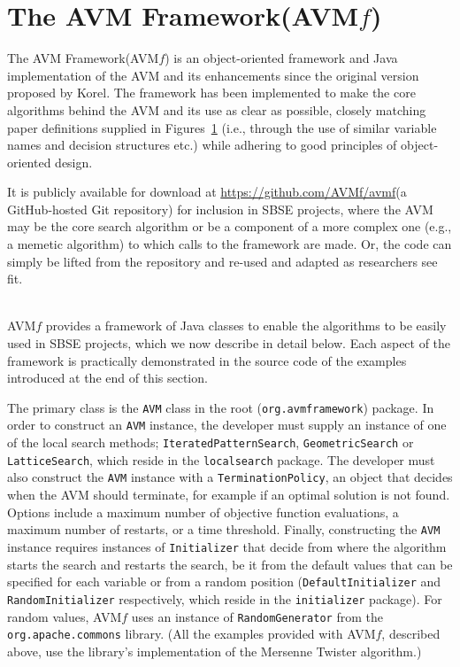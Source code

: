 \documentclass{llncs}
\newcommand{\longname}{AVM Framework\xspace}
\newcommand{\name}{AVM\hspace{-1pt}$f$\xspace}
\newcommand{\repourl}{\url{https://github.com/AVMf/avmf}\xspace}
\newcommand{\inlineheading}[1]{\vspace{1ex} \noindent {\bf #1.}}
\begin{document}
\section{The \longname (\name)}
The \longname (\name) is an object-oriented framework and Java implementation of the AVM and its enhancements since the original version proposed by Korel.  The framework has been implemented to make the core algorithms behind the AVM and its use as clear as possible, closely matching paper definitions supplied in Figures~\ref{} (i.e., through the use of similar variable names and decision structures etc.) while adhering to good principles of object-oriented design.

It is publicly available for download at \repourl (a GitHub-hosted Git repository) for inclusion in SBSE projects, where the AVM may be the core search algorithm or be a component of a more complex one (e.g., a memetic algorithm) to which calls to the framework are made. Or, the code can simply be lifted from the repository and re-used and adapted as researchers see fit.

~\\
\name provides a framework of Java classes to enable the algorithms to be easily used in SBSE projects, which we now describe in detail below. Each aspect of the framework is practically demonstrated in the source code of the examples introduced at the end of this section.

\begin{sloppypar}
\inlineheading{Configuring an AVM search} The primary class is the {\tt AVM} class in the root ({\tt org.avmframework}) package. In order to construct an {\tt AVM} instance, the developer must supply an instance of one of the local search methods; {\tt IteratedPatternSearch}, {\tt GeometricSearch} or {\tt LatticeSearch}, which reside in the {\tt localsearch} package. The developer must also construct the {\tt AVM} instance with a {\tt TerminationPolicy}, an object that decides when the AVM should terminate, for example if an optimal solution is not found. Options include a maximum number of objective function evaluations, a maximum number of restarts, or a time threshold. Finally, constructing the {\tt AVM} instance requires instances of {\tt Initializer} that decide from where the algorithm starts the search and restarts the search, be it from the default values that can be specified for each variable or from a random position ({\tt DefaultInitializer} and {\tt RandomInitializer} respectively, which reside in the {\tt initializer} package). For random values, \name uses an instance of {\tt RandomGenerator} from the {\tt org.apache.commons} library. (All the examples provided with \name, described above, use the library's implementation of the Mersenne Twister algorithm.)
\end{sloppypar}
\end{document}

